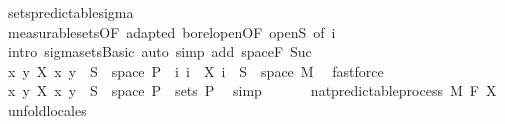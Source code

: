 \begin{isabellebody}
\ sets{\isacharunderscore}{\kern0pt}predictable{\isacharunderscore}{\kern0pt}sigma\ \isanewline
\ \ \ \ \ \ \ \ \isamarkupfalse%
\ measurable{\isacharunderscore}{\kern0pt}sets{\isacharbrackleft}{\kern0pt}OF\ adapted\ borel{\isacharunderscore}{\kern0pt}open{\isacharbrackleft}{\kern0pt}OF\ open{\isacharunderscore}{\kern0pt}S{\isacharbrackright}{\kern0pt}{\isacharcomma}{\kern0pt}\ of\ i{\isacharbrackright}{\kern0pt}\ \isanewline
\ \ \ \ \ \ \ \ \isamarkupfalse%
\ {\isacharparenleft}{\kern0pt}intro\ sigma{\isacharunderscore}{\kern0pt}sets{\isachardot}{\kern0pt}Basic{\isacharcomma}{\kern0pt}\ auto\ simp\ add{\isacharcolon}{\kern0pt}\ space{\isacharunderscore}{\kern0pt}F\ Suc{\isacharparenright}{\kern0pt}\isanewline
\ \ \ \ \isamarkupfalse%
\isanewline
\ \ \ \ \isamarkupfalse%
\ \isamarkupfalse%
\ {\isachardoublequoteopen}{\isacharparenleft}{\kern0pt}{\isasymlambda}{\isacharparenleft}{\kern0pt}x{\isacharcomma}{\kern0pt}\ y{\isacharparenright}{\kern0pt}{\isachardot}{\kern0pt}\ X\ x\ y{\isacharparenright}{\kern0pt}\ {\isacharminus}{\kern0pt}{\isacharbackquote}{\kern0pt}\ S\ {\isasyminter}\ space\ {\isasymSigma}\isactrlsub P\ {\isacharequal}{\kern0pt}\ {\isacharparenleft}{\kern0pt}{\isasymUnion}i{\isachardot}{\kern0pt}\ {\isacharbraceleft}{\kern0pt}i{\isacharbraceright}{\kern0pt}\ {\isasymtimes}\ {\isacharparenleft}{\kern0pt}X\ i\ {\isacharminus}{\kern0pt}{\isacharbackquote}{\kern0pt}\ S\ {\isasyminter}\ space\ M{\isacharparenright}{\kern0pt}{\isacharparenright}{\kern0pt}{\isachardoublequoteclose}\ \isamarkupfalse%
\ fastforce\isanewline
\ \ \ \ \isamarkupfalse%
\ \isamarkupfalse%
\ {\isachardoublequoteopen}{\isacharparenleft}{\kern0pt}{\isasymlambda}{\isacharparenleft}{\kern0pt}x{\isacharcomma}{\kern0pt}\ y{\isacharparenright}{\kern0pt}{\isachardot}{\kern0pt}\ X\ x\ y{\isacharparenright}{\kern0pt}\ {\isacharminus}{\kern0pt}{\isacharbackquote}{\kern0pt}\ S\ {\isasyminter}\ space\ {\isasymSigma}\isactrlsub P\ {\isasymin}\ sets\ {\isasymSigma}\isactrlsub P{\isachardoublequoteclose}\ \isamarkupfalse%
\ simp\isanewline
\ \ \isamarkupfalse%
\isanewline
\ \ \isamarkupfalse%
\ {\isachardoublequoteopen}nat{\isacharunderscore}{\kern0pt}predictable{\isacharunderscore}{\kern0pt}process\ M\ F\ X{\isachardoublequoteclose}\ \isamarkupfalse%
\ {\isacharparenleft}{\kern0pt}unfold{\isacharunderscore}{\kern0pt}locales{\isacharparenright}{\kern0pt}\isanewline
{}\isamarkupfalse%

\end{isabellebody}
